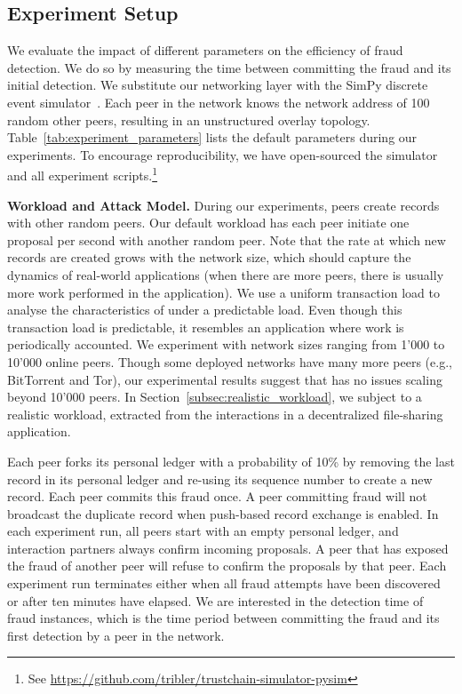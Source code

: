 \subsection{Experiment Setup}
We evaluate the impact of different parameters on the efficiency of fraud detection.
We do so by measuring the time between committing the fraud and its initial detection.
We substitute our networking layer with the SimPy discrete event simulator~\cite{matloff2008introduction}.
Each peer in the \ModelName{} network knows the network address of 100 random other peers, resulting in an unstructured overlay topology.
Table~\ref{tab:experiment_parameters} lists the default parameters during our experiments.
To encourage reproducibility, we have open-sourced the \ModelName{} simulator and all experiment scripts.\footnote{See \url{https://github.com/tribler/trustchain-simulator-pysim}}

\textbf{Workload and Attack Model.}
During our experiments, peers create records with other random peers.
Our default workload has each peer initiate one proposal per second with another random peer.
Note that the rate at which new records are created grows with the network size, which should capture the dynamics of real-world applications (when there are more peers, there is usually more work performed in the application).
We use a uniform transaction load to analyse the characteristics of \ModelName{} under a predictable load.
Even though this transaction load is predictable, it resembles an application where work is periodically accounted.
We experiment with network sizes ranging from 1'000 to 10'000 online peers.
Though some deployed networks have many more peers (e.g., BitTorrent and Tor), our experimental results suggest that \ModelName{} has no issues scaling beyond 10'000 peers.
In Section~\ref{subsec:realistic_workload}, we subject \ModelName{} to a realistic workload, extracted from the interactions in a decentralized file-sharing application.

Each peer forks its personal ledger with a probability of 10\% by removing the last record in its personal ledger and re-using its sequence number to create a new record.
Each peer commits this fraud once.
A peer committing fraud will not broadcast the duplicate record when push-based record exchange is enabled.
In each experiment run, all peers start with an empty personal ledger, and interaction partners always confirm incoming proposals.
A peer that has exposed the fraud of another peer will refuse to confirm the proposals by that peer.
Each experiment run terminates either when all fraud attempts have been discovered or after ten minutes have elapsed.
We are interested in the detection time of fraud instances, which is the time period between committing the fraud and its first detection by a peer in the network.

